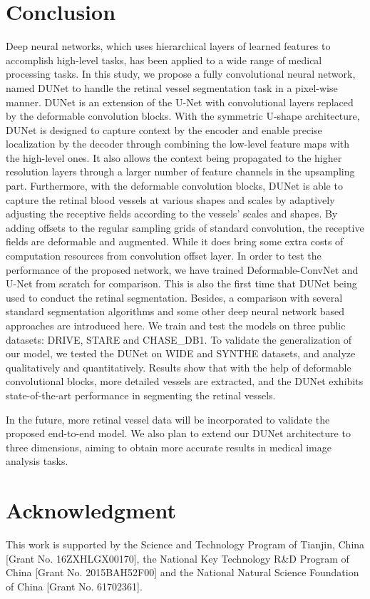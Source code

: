 \documentclass[journal]{IEEEtran}
\begin{document}
\section{Conclusion}
\label{sec:conclusion}
Deep neural networks, which uses hierarchical layers of learned features to accomplish high-level tasks, has been applied to a wide range of medical processing tasks. In this study, we propose a fully convolutional neural network, named DUNet to handle the retinal vessel segmentation task in a pixel-wise manner. DUNet is an extension of the U-Net with convolutional layers replaced by the deformable convolution blocks. With the symmetric U-shape architecture, DUNet is designed to capture context by the encoder and enable precise localization by the decoder through combining the low-level feature maps with the high-level ones. It also allows the context being propagated to the higher resolution layers through a larger number of feature channels in the upsampling part. Furthermore, with the deformable convolution blocks, DUNet is able to capture the retinal blood vessels at various shapes and scales by adaptively adjusting the receptive fields according to the vessels' scales and shapes. By adding offsets to the regular sampling grids of standard convolution, the receptive fields are deformable and augmented. While it does bring some extra costs of computation resources from convolution offset layer. In order to test the performance of the proposed network, we have trained Deformable-ConvNet and U-Net from scratch for comparison. This is also the first time that DUNet being used to conduct the retinal segmentation. Besides, a comparison with several standard segmentation algorithms and some other deep neural network based approaches are introduced here. We train and test the models on three public datasets: DRIVE, STARE and CHASE\_DB1. To validate the generalization of our model, we tested the DUNet on WIDE and SYNTHE datasets, and analyze qualitatively and quantitatively. Results show that with the help of deformable convolutional blocks, more detailed vessels are extracted, and the DUNet exhibits state-of-the-art performance in segmenting the retinal vessels.

In the future, more retinal vessel data will be incorporated to validate the proposed end-to-end model. We also plan to extend our DUNet architecture to three dimensions, aiming to obtain more accurate results in medical image analysis tasks.


\section*{Acknowledgment}

This work is supported by the Science and Technology Program of Tianjin, China [Grant No. 16ZXHLGX00170], the National Key Technology R\&D Program of China [Grant No. 2015BAH52F00] and the National Natural Science Foundation of China [Grant No. 61702361].


\ifCLASSOPTIONcaptionsoff
  \newpage
\fi



\end{document}
